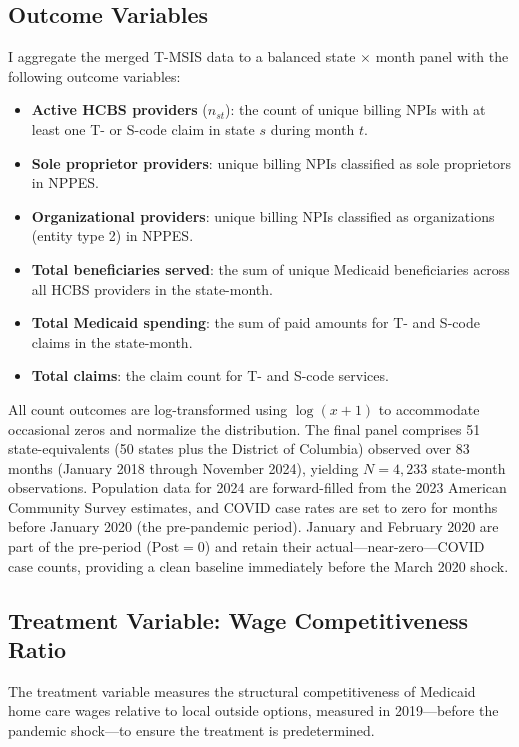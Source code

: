 \documentclass[12pt]{article}
\begin{document}
\subsection{Outcome Variables}

I aggregate the merged T-MSIS data to a balanced state $\times$ month panel with the following outcome variables:

\begin{itemize}
\item \textbf{Active HCBS providers} ($n_{st}$): the count of unique billing NPIs with at least one T- or S-code claim in state $s$ during month $t$.
\item \textbf{Sole proprietor providers}: unique billing NPIs classified as sole proprietors in NPPES.
\item \textbf{Organizational providers}: unique billing NPIs classified as organizations (entity type 2) in NPPES.
\item \textbf{Total beneficiaries served}: the sum of unique Medicaid beneficiaries across all HCBS providers in the state-month.
\item \textbf{Total Medicaid spending}: the sum of paid amounts for T- and S-code claims in the state-month.
\item \textbf{Total claims}: the claim count for T- and S-code services.
\end{itemize}

All count outcomes are log-transformed using $\log(x + 1)$ to accommodate occasional zeros and normalize the distribution. The final panel comprises 51 state-equivalents (50 states plus the District of Columbia) observed over 83 months (January 2018 through November 2024), yielding $N = 4{,}233$ state-month observations. Population data for 2024 are forward-filled from the 2023 American Community Survey estimates, and COVID case rates are set to zero for months before January 2020 (the pre-pandemic period). January and February 2020 are part of the pre-period ($\text{Post} = 0$) and retain their actual---near-zero---COVID case counts, providing a clean baseline immediately before the March 2020 shock.

\subsection{Treatment Variable: Wage Competitiveness Ratio}

The treatment variable measures the structural competitiveness of Medicaid home care wages relative to local outside options, measured in 2019---before the pandemic shock---to ensure the treatment is predetermined.
\end{document}
